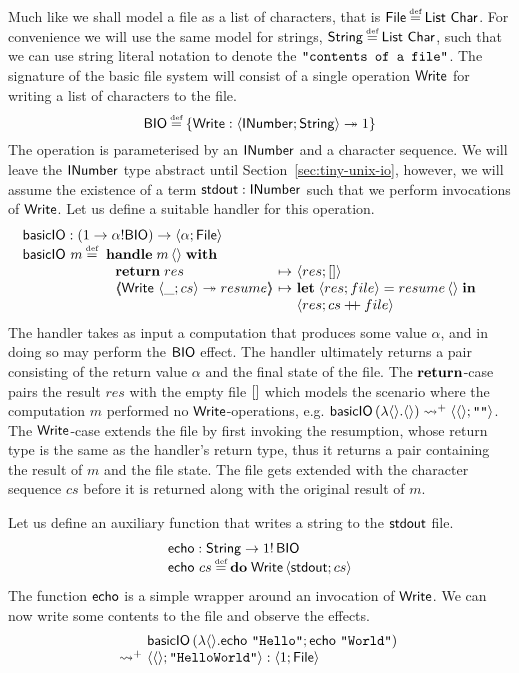 \documentclass[12pt,phd,lfcs,twoside,openright,logo,leftchapter,normalheadings]{infthesis}
\theoremstyle{plain}
\theoremstyle{definition}
\begin{document}
Much like \UNIX{} we shall model a file as a list of characters, that is
$\UFile \defas \List~\Char$. For convenience we will use the same
model for strings, $\String \defas \List~\Char$, such that we can use
string literal notation to denote the $\texttt{"contents of a file"}$.
%
The signature of the basic file system will consist of a single
operation $\mathsf{Write}$ for writing a list of characters to the file.
%
\[
  \BIO \defas \{\Write : \Record{\UFD;\String} \opto \UnitType\}
\]
%
The operation is parameterised by an $\mathsf{INumber}$ and a character
sequence. We will leave the $\mathsf{INumber}$ type abstract until
Section~\ref{sec:tiny-unix-io}, however, we will assume the existence
of a term $\mathsf{stdout} : \mathsf{INumber}$ such that we perform invocations of
$\mathsf{Write}$.
%
Let us define a suitable handler for this operation.
%
\[
  \bl
    \basicIO : (\UnitType \to \alpha \eff \BIO) \to \Record{\alpha; \UFile}\\
    \basicIO~m \defas
       \ba[t]{@{~}l}
         \Handle\;m\,\Unit\;\With\\
           ~\ba{@{~}l@{~}c@{~}l}
              \Return\;res &\mapsto& \Record{res;\nil}\\
              \OpCase{\Write}{\Record{\_;cs}}{resume} &\mapsto&
                 \ba[t]{@{}l}
                   \Let\; \Record{res;file} = resume\,\Unit\;\In\\
                   \Record{res; cs \concat file}
                 \ea
           \ea
       \ea
  \el
\]
%
The handler takes as input a computation that produces some value
$\alpha$, and in doing so may perform the $\mathsf{BIO}$ effect.
%
The handler ultimately returns a pair consisting of the return value
$\alpha$ and the final state of the file.
%
The $\mathbf{return}$-case pairs the result $res$ with the empty file $[]$
which models the scenario where the computation $m$ performed no
$\mathsf{Write}$-operations, e.g.
$\mathsf{basicIO}\,(\lambda\langle  \rangle.\langle  \rangle) \leadsto^+
\langle \langle  \rangle;\texttt{""} \rangle$.
%
The $\mathsf{Write}$-case extends the file by first invoking the resumption,
whose return type is the same as the handler's return type, thus it
returns a pair containing the result of $m$ and the file state. The
file gets extended with the character sequence $cs$ before it is
returned along with the original result of $m$.%

Let us define an auxiliary function that writes a string to the $\mathsf{stdout}$ file.
%
\[
  \bl
    \echo : \String \to \UnitType \eff\, \BIO\\%
    \echo~cs \defas \Do\;\Write\,\Record{\stdout;cs}
  \el
\]
%
The function $\mathsf{echo}$ is a simple wrapper around an invocation of
$\mathsf{Write}$.
%
We can now write some contents to the file and observe the effects.
%
\[
  \ba{@{~}l@{~}l}
                &\basicIO\,(\lambda\Unit. \echo~\strlit{Hello}; \echo~\strlit{World})\\
    \reducesto^+& \Record{\Unit;\strlit{HelloWorld}} : \Record{\UnitType;\UFile}
  \ea
\]
\end{document}
